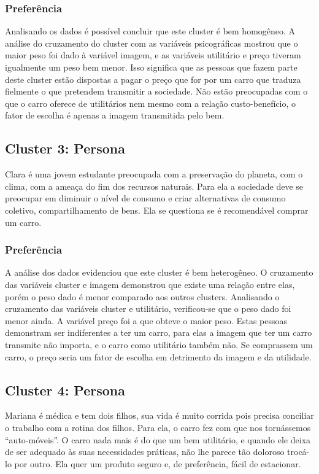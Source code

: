 \subsubsection{Preferência}
Analisando os dados é possível concluir que este cluster é bem homogêneo. A análise
do cruzamento do cluster com as variáveis psicográficas mostrou que
o maior peso foi dado à variável imagem, e as variáveis utilitário
e preço tiveram igualmente um peso bem menor. Isso significa que as
pessoas que fazem parte deste cluster estão dispostas a pagar o preço
que for por um carro que traduza fielmente o que pretendem transmitir
a sociedade. Não estão preocupadas com o que o carro oferece de utilitários
nem mesmo com a relação custo-benefício, o fator de escolha é apenas
a imagem transmitida pelo bem. 


\subsection{Cluster 3: Persona \nomeCc{} }

Clara é uma jovem estudante preocupada com a preservação
do planeta, com o clima, com a ameaça do fim dos recursos naturais.
Para ela a sociedade deve se preocupar em diminuir o nível de consumo
e criar alternativas de consumo coletivo, compartilhamento de bens.
Ela se questiona se é recomendável comprar um carro. 

\subsubsection{Preferência}
A análise dos dados evidenciou que este cluster é bem heterogêneo.
O cruzamento das variáveis cluster e imagem demonstrou que existe
uma relação entre elas, porém o peso dado é menor comparado aos outros
clusters. Analisando o cruzamento das variáveis cluster e utilitário,
verificou-se que o peso dado foi menor ainda. A variável preço foi
a que obteve o maior peso. Estas pessoas demonstram ser indiferentes
a ter um carro, para elas a imagem que ter um carro transmite não
importa, e o carro como utilitário também não. Se comprassem um carro,
o preço seria um fator de escolha em detrimento da imagem e da utilidade. 

\subsection{Cluster 4: Persona \nomeCd{} }

Mariana é médica e tem dois filhos, sua vida é muito corrida pois
precisa conciliar o trabalho com a rotina dos filhos. Para ela, o
carro fez com que nos tornássemos \textquotedblleft auto-móveis\textquotedblright .
O carro nada mais é do que um bem utilitário, e quando ele deixa de
ser adequado às suas necessidades práticas, não lhe parece tão doloroso
trocá-lo por outro. Ela quer um produto seguro e, de preferência,
fácil de estacionar. 

